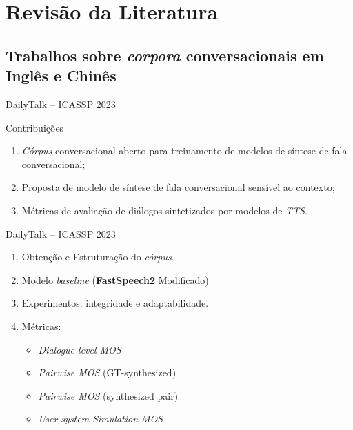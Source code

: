 \section{Revisão da Literatura}
\subsection[EN e CH]{Trabalhos sobre \textit{corpora} conversacionais em Inglês e Chinês}

\begin{frame}{DailyTalk -- ICASSP 2023}
  \begin{block}{Contribuições}
    \begin{enumerate}
      \item \textit{Córpus} conversacional aberto para treinamento de modelos de síntese
        de fala conversacional;
      \item Proposta de modelo de síntese de fala conversacional sensível ao contexto;
      \item Métricas de avaliação de diálogos sintetizados por modelos de \textit{TTS}.
    \end{enumerate}
  \end{block}
\end{frame}

\begin{frame}{DailyTalk -- ICASSP 2023}
  \begin{block}{}
    \begin{enumerate}
      \item<1-> Obtenção e Estruturação do \textit{córpus}.
      \item<2-> Modelo \textit{baseline} (\textbf{FastSpeech2} \cite{FastSpeech2} Modificado)
      \item<3-> Experimentos: integridade e adaptabilidade.
      \item<4-> Métricas:
        \begin{itemize}
          \item \textit{Dialogue-level MOS}
          \item \textit{Pairwise MOS} (GT-synthesized)
          \item \textit{Pairwise MOS} (synthesized pair)
          \item \textit{User-system Simulation MOS}
        \end{itemize}
    \end{enumerate}
  \end{block}
\end{frame}

